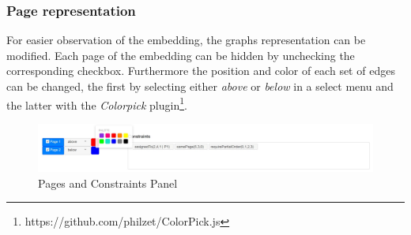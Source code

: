 \subsubsection{Page representation}
For easier observation of the embedding, the graphs representation can be modified. Each page of the embedding can be hidden by unchecking the corresponding checkbox. Furthermore the position and color of each set of edges can be changed, the first by selecting either \textit{above} or \textit{below} in a select menu and the latter with the \textit{Colorpick} plugin\footnote{https://github.com/philzet/ColorPick.js}.
\begin{figure}[!h]
\begin{center}
\includegraphics[width=1\textwidth]{figures/figSecond/ConfigPanel.jpg}
\caption{Pages and Constraints Panel}
\label{img:plzhltr}
\end{center}
\end{figure}

\clearpage
